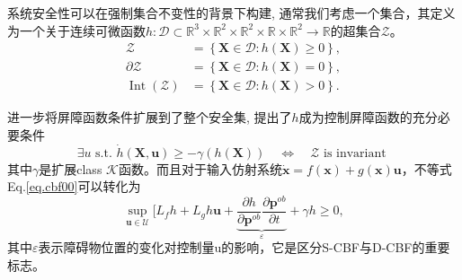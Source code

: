 \documentclass[preprint,5p,times,twocolumn]{elsarticle}
\begin{document}
系统安全性可以在强制集合不变性的背景下构建, 通常我们考虑一个集合，其定义为一个关于连续可微函数$h:\mathcal{D} \subset \mathbb{R}^3 \times \mathbb{R}^2 \times \mathbb{R}^2 \times \mathbb{R} \times \mathbb{R}^2 \to \mathbb{R}$的超集合$\mathcal{Z}$。
\begin{equation}
\label{eq.safeXet}
\begin{aligned}
\mathcal{Z} & =\left\{\boldsymbol{X} \in \mathcal{D} : h(\boldsymbol{X}) \geq 0\right\}, \\
\partial \mathcal{Z} & =\left\{\boldsymbol{X} \in \mathcal{D} : h(\boldsymbol{X})=0\right\}, \\
\operatorname{Int}(\mathcal{Z}) & =\left\{\boldsymbol{X} \in \mathcal{D} :h(\boldsymbol{X})>0\right\}.
\end{aligned}
\end{equation}

进一步将屏障函数条件扩展到了整个安全集, 提出了$h$成为控制屏障函数的充分必要条件\citep{ames2019controlBF}
\begin{equation}
\label{eq.cbf00}
\exists u \text { s.t. } \dot{h}(\boldsymbol{X}, \boldsymbol{u}) \geq-\gamma(h(\boldsymbol{X})) \quad \Leftrightarrow \quad \mathcal{Z} \text { is invariant }
\end{equation}
其中$\gamma$是扩展class $\mathcal{K}$函数。而且对于输入仿射系统$\dot{\boldsymbol{x}}=f(\boldsymbol{x})+g(\boldsymbol{x}) \boldsymbol{u}$，不等式Eq.\ref{eq.cbf00}可以转化为
\begin{equation}
\label{eq.cbf00a}
\sup _{\boldsymbol{u} \in \mathcal{U}}[L_f h+L_g h \boldsymbol{u}+\underbrace{\frac{\partial h}{\partial \boldsymbol{p}^{ob}} \frac{\partial \boldsymbol{p}^{ob}}{\partial t}}_{\varepsilon}+\gamma h \geqslant 0, 
\end{equation}
其中$\varepsilon$表示障碍物位置的变化对控制量$\mathrm{u}$的影响，它是区分S-CBF与D-CBF的重要标志。
\end{document}
